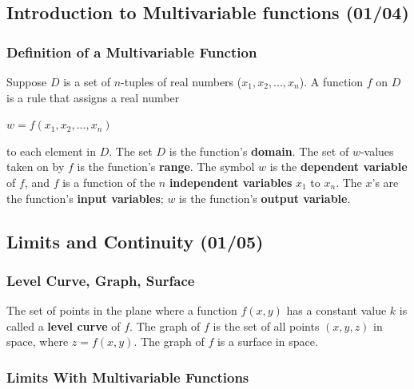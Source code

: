 \documentclass[
  letterpaper,
  DIV=11,
  numbers=noendperiod]{scrartcl}
\begin{document}
\hypertarget{introduction-to-multivariable-functions-0104}{%
\subsection{Introduction to Multivariable functions
(01/04)}\label{introduction-to-multivariable-functions-0104}}

\hypertarget{definition-of-a-multivariable-function}{%
\subsubsection{Definition of a Multivariable
Function}\label{definition-of-a-multivariable-function}}

Suppose \(D\) is a set of \(n\)-tuples of real numbers
(\(x_1, x_2, ..., x_n\)). A function \(f\) on \(D\) is a rule that
assigns a real number

\(w = f(x_1, x_2, ..., x_n)\)

to each element in \(D\). The set \(D\) is the function's
\textbf{domain}. The set of \(w\)-values taken on by \(f\) is the
function's \textbf{range}. The symbol \(w\) is the \textbf{dependent
variable} of \(f\), and \(f\) is a function of the \(n\)
\textbf{independent variables} \(x_1\) to \(x_n\). The \(x\)'s are the
function's \textbf{input variables}; \(w\) is the function's
\textbf{output variable}.

\hypertarget{limits-and-continuity-0105}{%
\subsection{Limits and Continuity
(01/05)}\label{limits-and-continuity-0105}}

\hypertarget{level-curve-graph-surface}{%
\subsubsection{Level Curve, Graph,
Surface}\label{level-curve-graph-surface}}

The set of points in the plane where a function \(f(x, y)\) has a
constant value \(k\) is called a \textbf{level curve} of \(f\). The
graph of \(f\) is the set of all points \((x, y, z)\) in space, where
\(z = f(x, y)\). The graph of \(f\) is a surface in space.

\hypertarget{limits-with-multivariable-functions}{%
\subsubsection{Limits With Multivariable
Functions}\label{limits-with-multivariable-functions}}
\end{document}
